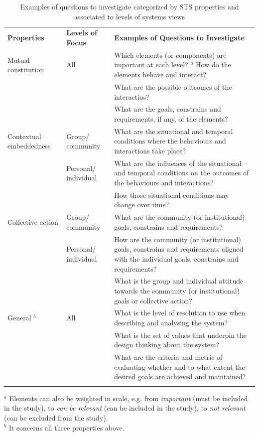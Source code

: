 \begin{table}
\caption{Examples of questions to investigate categorized by STS properties and associated to levels of systems views }
\label{tab:questions}       %
%
%
\begin{tabular}{>{\raggedright}p{2cm}>{\raggedright}p{2.1cm}p{7.5cm}}
\hline\noalign{\smallskip}
\textbf{Properties}  & \textbf{Levels of Focus} &   \textbf{Examples of Questions to Investigate} \\
\noalign{\smallskip}\svhline\noalign{\smallskip}
Mutual constitution & All  & Which elements (or components) are important at each level? $^a$  How do the elements behave and interact?\\
 &  & What are the possible outcomes of the interactios?\\
 &  & What are the goals, constrains and requirements, if any, of the elements?\\ \hline\noalign{\smallskip}
Contextual embeddedness &   Group/ community & What are the situational and temporal conditions where the behaviours and interactions take place? \\
 & Personal/ individual  & What are the influences of  the situational and temporal conditions on the outcomes of the behaviours and interactions?\\
 &  & How those situational conditions may change over time?\\ \hline\noalign{\smallskip}
Collective action   & Group/ community & What are the community (or institutional) goals, constrains and requirements?\\
   &  Personal/ individual  & How are the community (or institutional) goals, constrains and requirements aligned with the individual goals, constrains and requirements? \\
   & & What is the group and individual attitude towards the community (or institutional) goals or collective action? \\ \hline\noalign{\smallskip}
General $^b$ & All  & What is the level of resolution to use when describing and analysing the system? \\
& & What is the set of values that underpin the design thinking about the system? \\
& & What are the criteria and metric of evaluating whether and to what extent the desired goals are achieved and maintained? \\
\noalign{\smallskip}\hline\noalign{\smallskip}
\end{tabular}
$^a$ Elements can also be weighted in scale, e.g. from \textit{important} (must be included in the study), to \textit{can be relevant} (can be included in the study), to \textit{not relevant} (can be excluded from the study).\\
$^b$ It concerns all three properties above. 
\end{table}
%
%

